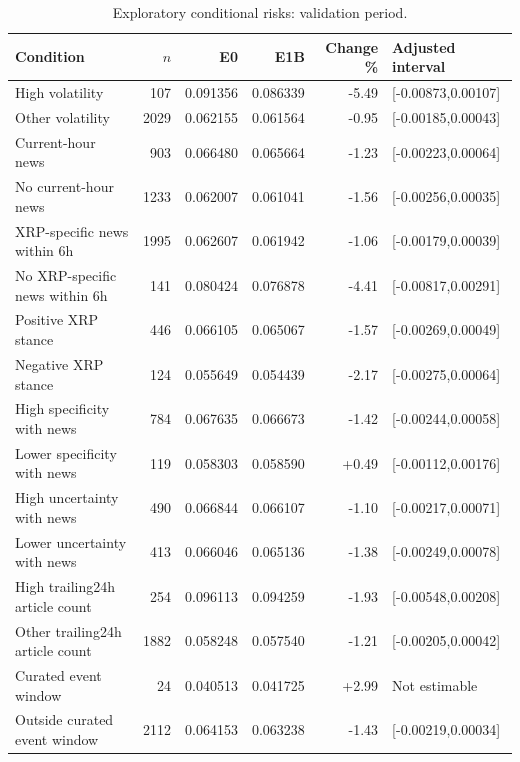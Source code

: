 \begin{table}[htbp]\centering\small
\caption{Exploratory conditional risks: validation period.}\label{tab:conditionalall}
\begin{tabular}{p{.30\linewidth}rrrrp{.22\linewidth}}\toprule
Condition & $n$ & E0 & E1B & Change \% & Adjusted interval\\\midrule
High volatility & 107 & 0.091356 & 0.086339 & -5.49 & [-0.00873,0.00107]\\
Other volatility & 2029 & 0.062155 & 0.061564 & -0.95 & [-0.00185,0.00043]\\
Current-hour news & 903 & 0.066480 & 0.065664 & -1.23 & [-0.00223,0.00064]\\
No current-hour news & 1233 & 0.062007 & 0.061041 & -1.56 & [-0.00256,0.00035]\\
XRP-specific news within 6h & 1995 & 0.062607 & 0.061942 & -1.06 & [-0.00179,0.00039]\\
No XRP-specific news within 6h & 141 & 0.080424 & 0.076878 & -4.41 & [-0.00817,0.00291]\\
Positive XRP stance & 446 & 0.066105 & 0.065067 & -1.57 & [-0.00269,0.00049]\\
Negative XRP stance & 124 & 0.055649 & 0.054439 & -2.17 & [-0.00275,0.00064]\\
High specificity with news & 784 & 0.067635 & 0.066673 & -1.42 & [-0.00244,0.00058]\\
Lower specificity with news & 119 & 0.058303 & 0.058590 & +0.49 & [-0.00112,0.00176]\\
High uncertainty with news & 490 & 0.066844 & 0.066107 & -1.10 & [-0.00217,0.00071]\\
Lower uncertainty with news & 413 & 0.066046 & 0.065136 & -1.38 & [-0.00249,0.00078]\\
High trailing24h article count & 254 & 0.096113 & 0.094259 & -1.93 & [-0.00548,0.00208]\\
Other trailing24h article count & 1882 & 0.058248 & 0.057540 & -1.21 & [-0.00205,0.00042]\\
Curated event window & 24 & 0.040513 & 0.041725 & +2.99 & Not estimable\\
Outside curated event window & 2112 & 0.064153 & 0.063238 & -1.43 & [-0.00219,0.00034]\\\bottomrule\end{tabular}
\end{table}

